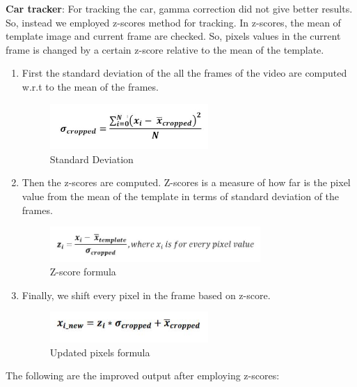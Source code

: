 \documentclass[12pt]{article}
\begin{document}
\textbf{Car tracker}: For tracking the car, gamma correction did not give better results. So, instead we employed z-scores method for tracking. In z-scores, the mean of template image and current frame are checked. So, pixels values in the current frame is changed by a certain z-score relative to the mean of the template. 
\begin{enumerate}
\item First the standard deviation of the all the frames of the video are computed w.r.t to the mean of the frames.
\newpage
\begin{figure}[h]
    \centering
    \includegraphics[width=6cm]{zscore}
    \caption{Standard Deviation}
    \label{fig:Standard Deviation}
\end{figure}
\item Then the z-scores are computed. Z-scores is a measure of how far is the pixel value from the mean of the template in terms of standard deviation of the frames.
\begin{figure}[h]
    \centering
    \includegraphics[width=8cm]{zscore1}
    \caption{Z-score formula}
    \label{fig:Z- score formula}
\end{figure}
\item Finally, we shift every pixel in the frame based on z-score.
\begin{figure}[h]
    \centering
    \includegraphics[width=6cm]{zscore2}
    \caption{Updated pixels formula}
    \label{fig:Updated pixels formula}
\end{figure}
\end{enumerate}
The following are the improved output after employing z-scores:
\end{document}
